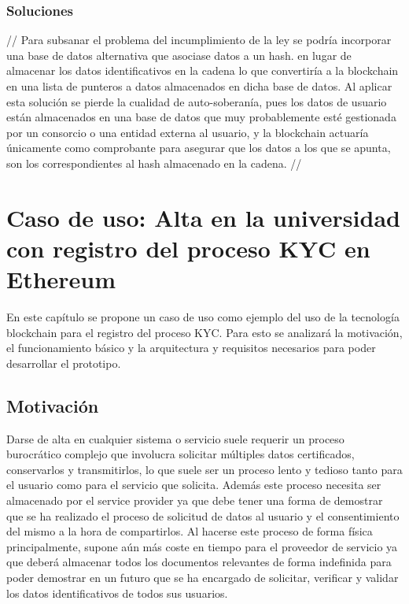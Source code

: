 \documentclass[12pt]{report}
\begin{document}
\subsection{Soluciones}
//
Para subsanar el problema del incumplimiento de la ley se podría incorporar una base de datos alternativa que asociase datos a un hash. en lugar de almacenar los datos identificativos en la cadena lo que convertiría a la blockchain en una lista de punteros a datos almacenados en dicha base de datos. Al aplicar esta solución se pierde la cualidad de auto-soberanía, pues los datos de usuario están almacenados en una base de datos que muy probablemente esté gestionada por un consorcio o una entidad externa al usuario, y la blockchain actuaría únicamente como comprobante para asegurar que los datos a los que se apunta, son los correspondientes al hash almacenado en la cadena.
//
\chapter{Caso de uso: Alta en la universidad con registro del proceso KYC en Ethereum}
En este capítulo se propone un caso de uso como ejemplo del uso de la tecnología blockchain para el registro del proceso KYC. Para esto se analizará la motivación, el funcionamiento básico y la arquitectura y requisitos necesarios para poder desarrollar el prototipo.

\section{Motivación}
Darse de alta en cualquier sistema o servicio suele requerir un proceso burocrático complejo que involucra solicitar múltiples datos certificados, conservarlos y transmitirlos, lo que suele ser un proceso lento y tedioso tanto para el usuario como para el servicio que solicita. Además este proceso necesita ser almacenado por el service provider ya que debe tener una forma de demostrar que se ha realizado el proceso de solicitud de datos al usuario y el consentimiento del mismo a la hora de compartirlos. Al hacerse este proceso de forma física principalmente, supone aún más coste en tiempo para el proveedor de servicio ya que deberá almacenar todos los documentos relevantes de forma indefinida para poder demostrar en un futuro que se ha encargado de solicitar, verificar y validar los datos identificativos de todos sus usuarios.
\end{document}
